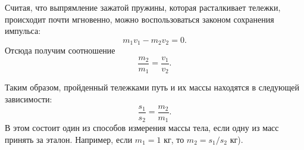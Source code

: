 \documentclass[14pt,a4paper,oneside]{extarticle}	%
\begin{document}
Считая, что выпрямление зажатой пружины, которая расталкивает тележки, происходит почти мгновенно, можно воспользоваться законом сохранения импульса:
\begin{equation}\label{newton-eq4}
m_{1}v_{1} - m_{2}v_{2} = 0.
\end{equation}
Отсюда получим соотношение
\begin{equation}\label{newton-eq5}
\frac{m_{2}}{m_{1}} = \frac{v_{1}}{v_{2}}.
\end{equation}

Таким образом, пройденный тележками путь и их массы находятся в следующей зависимости:
\begin{equation}\label{newton-eq6}
\frac{s_{1}}{s_{2}} = \frac{m_{2}}{m_{1}}.
\end{equation}
В этом состоит один из способов измерения массы тела, если одну из масс принять за эталон.
Например, если $m_{1}=1$ кг, то $m_{2}=s_1/s_2$ кг).
\end{document}

